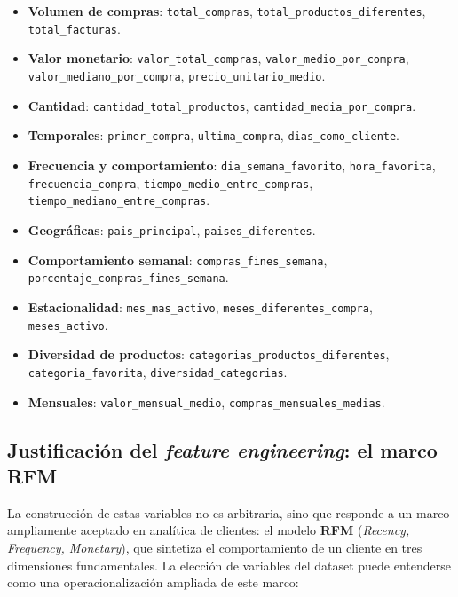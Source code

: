 \documentclass[11pt,a4paper]{article}
\begin{document}
\begin{itemize}
    \item \textbf{Volumen de compras}: \texttt{total\_compras}, \texttt{total\_productos\_diferentes}, \texttt{total\_facturas}.
    \item \textbf{Valor monetario}: \texttt{valor\_total\_compras}, \texttt{valor\_medio\_por\_compra}, \texttt{valor\_mediano\_por\_compra}, \texttt{precio\_unitario\_medio}.
    \item \textbf{Cantidad}: \texttt{cantidad\_total\_productos}, \texttt{cantidad\_media\_por\_compra}.
    \item \textbf{Temporales}: \texttt{primer\_compra}, \texttt{ultima\_compra}, \texttt{dias\_como\_cliente}.
    \item \textbf{Frecuencia y comportamiento}: \texttt{dia\_semana\_favorito}, \texttt{hora\_favorita}, \texttt{frecuencia\_compra}, \texttt{tiempo\_medio\_entre\_compras}, \texttt{tiempo\_mediano\_entre\_compras}.
    \item \textbf{Geográficas}: \texttt{pais\_principal}, \texttt{paises\_diferentes}.
    \item \textbf{Comportamiento semanal}: \texttt{compras\_fines\_semana}, \texttt{porcentaje\_compras\_fines\_semana}.
    \item \textbf{Estacionalidad}: \texttt{mes\_mas\_activo}, \texttt{meses\_diferentes\_compra}, \texttt{meses\_activo}.
    \item \textbf{Diversidad de productos}: \texttt{categorias\_productos\_diferentes}, \texttt{categoria\_favorita}, \texttt{diversidad\_categorias}.
    \item \textbf{Mensuales}: \texttt{valor\_mensual\_medio}, \texttt{compras\_mensuales\_medias}.
\end{itemize}

\subsection*{Justificación del \textit{feature engineering}: el marco RFM}

La construcción de estas variables no es arbitraria, sino que responde a un marco ampliamente aceptado en analítica de clientes: el modelo \textbf{RFM} (\textit{Recency, Frequency, Monetary}), que sintetiza el comportamiento de un cliente en tres dimensiones fundamentales. La elección de variables del dataset puede entenderse como una operacionalización ampliada de este marco:
\end{document}
